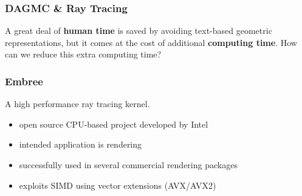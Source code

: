 \documentclass[12pt]{beamer}
\begin{document}
\begin{frame}

  \frametitle{DAGMC \& Ray Tracing}
  
  A great deal of \textbf{human time} is saved by avoiding text-based geometric representations, but it comes at the cost of additional \textbf{computing time}.
 \vfill
 How can we reduce this extra computing time?

 \vfill

  
\end{frame}

\begin{frame}
  \frametitle{Embree}
  \begin{center}
  \end{center}
  A high performance ray tracing kernel. {\scriptsize \cite{embree}}
  \vfill
  \begin{itemize}
  \item open source CPU-based project developed by Intel
  \item intended application is rendering
  \item successfully used in several commercial rendering packages
  \item exploits SIMD using vector extensions (AVX/AVX2) 
  \end{itemize}

  
\end{frame}
\end{document}
